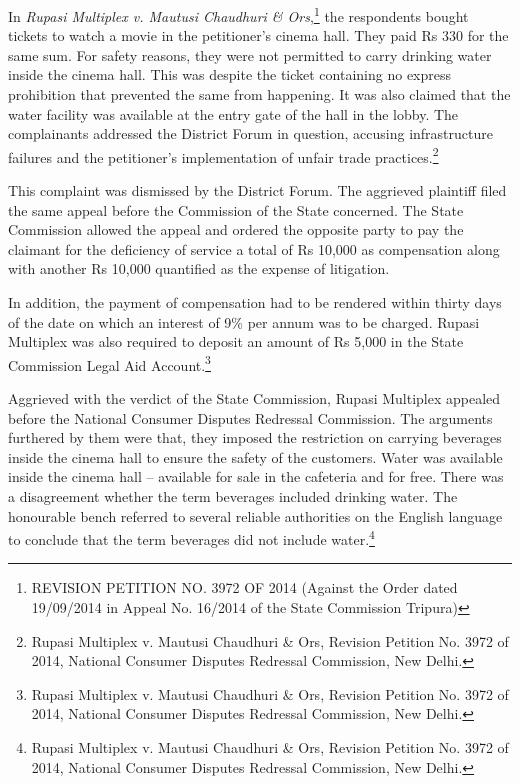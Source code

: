 \begin{multicols}{2}
\noi
In \textit{Rupasi Multiplex v. Mautusi Chaudhuri \& Ors},\footnote{REVISION PETITION NO. 3972 OF 2014 (Against the Order dated 19/09/2014 in Appeal No. 16/2014 of the State Commission Tripura)} the respondents bought tickets to watch a movie in the petitioner's cinema hall. They paid Rs 330 for the same sum. For safety reasons, they were not permitted to carry drinking water inside the cinema hall. This was despite the ticket containing no express prohibition that prevented the same from happening. It was also claimed that the water facility was available at the entry gate of the hall in the lobby. The complainants addressed the District Forum in question, accusing infrastructure failures and the petitioner's implementation of unfair trade practices.\footnote{ Rupasi Multiplex v. Mautusi Chaudhuri \& Ors, Revision Petition No. 3972 of 2014, National Consumer Disputes Redressal Commission, New Delhi.}

\vspace{-.1cm}

\noi
This complaint was dismissed by the District Forum. The aggrieved plaintiff filed the same appeal before the Commission of the State concerned. The State Commission allowed the appeal and ordered the opposite party to pay the claimant for the deficiency of service a total of Rs 10,000 as compensation along with another Rs 10,000 quantified as the expense of litigation.

\vspace{-.1cm}

\noi
In addition, the payment of compensation had to be rendered within thirty days of the date on
which an interest of 9\% per annum was to be charged. Rupasi Multiplex was also required to deposit an amount of Rs 5,000 in the State Commission Legal Aid Account.\footnote{Rupasi Multiplex v. Mautusi Chaudhuri \& Ors, Revision Petition No. 3972 of 2014, National Consumer Disputes Redressal Commission, New Delhi.}

\vspace{-.1cm}

\noi
Aggrieved with the verdict of the State Commission, Rupasi Multiplex appealed before the
National Consumer Disputes Redressal Commission. The arguments furthered by them were
that, they imposed the restriction on carrying beverages inside the cinema hall to ensure the
safety of the customers. Water was available inside the cinema hall – available for sale in the
cafeteria and for free. There was a disagreement whether the term beverages included drinking
water. The honourable bench referred to several reliable authorities on the English language to
conclude that the term beverages did not include water.\footnote{Rupasi Multiplex v. Mautusi Chaudhuri \& Ors, Revision Petition No. 3972 of 2014, National Consumer Disputes Redressal Commission, New Delhi.}


\end{multicols}
